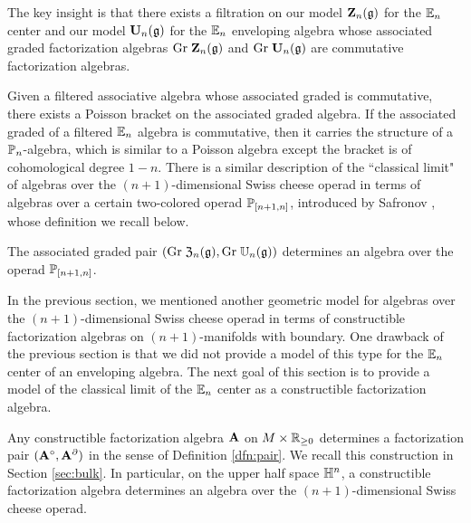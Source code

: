 \documentclass[11pt]{amsart}
\numberwithin{equation}{section}
\begin{document}
The key insight is that there exists a filtration on our model $\mathbf Z_n(\mathfrak g)$ for the $\mathbb E_n$ center and our model $\mathbf U_n (\mathfrak g)$ for the $\mathbb E_n$ enveloping algebra  whose associated graded factorization algebras ${\rm Gr} \; \mathbf Z_n(\mathfrak g)$ and ${\rm Gr} \; \mathbf U_n(\mathfrak g)$ are commutative factorization algebras. 

Given a filtered associative algebra whose associated graded is commutative, there exists a Poisson bracket on the associated graded algebra. 
If the associated graded of a filtered $\mathbb E_n$ algebra is commutative, then it carries the structure of a $\mathbb P_n$-algebra, which is similar to a Poisson algebra except the bracket is of cohomological degree $1-n$. 
There is a similar description of the ``classical limit"  of algebras over the $(n+1)$-dimensional Swiss cheese operad in terms of algebras over a certain two-colored operad $\mathbb P_{[n+1,n]}$, introduced by Safronov \cite{Pavel1, Pavel2}, whose definition we recall below.

\begin{prp} 
\label{prp:poisson}
The associated graded pair $({\rm Gr} \; \mathfrak Z_n(\mathfrak g) , {\rm Gr} \; \mathbb U_n(\mathfrak g))$ determines an algebra over the operad $\mathbb P_{[n+1,n]}$. 
\end{prp}



In the previous section, we mentioned another geometric model for algebras over the $(n+1)$-dimensional Swiss cheese operad in terms of constructible factorization algebras on $(n+1)$-manifolds with boundary.
One drawback of the previous section is that we did not provide a model of this type for the $\mathbb E_n$ center of an enveloping algebra. 
The next goal of this section is to provide a model of the classical limit of the $\mathbb E_n$ center as a constructible factorization algebra. 

Any constructible factorization algebra $\mathbf A$ on $M \times \mathbb R_{\geq 0}$ determines a factorization pair $(\mathbf A^\circ , \mathbf A^{\partial})$ in the sense of Definition \ref{dfn:pair}.
We recall this construction in Section \ref{sec:bulk}. 
In particular, on the upper half space $\mathbb H^n$, a constructible factorization algebra determines an algebra over the $(n+1)$-dimensional Swiss cheese operad. 
\end{document}
